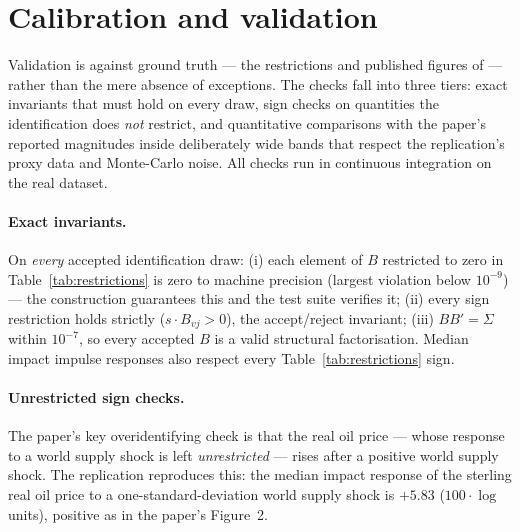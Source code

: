 \section{Calibration and validation}
\label{sec:validation}

Validation is against ground truth --- the restrictions and published figures of \citet{brignone2025} --- rather than the mere absence of exceptions. The checks fall into three tiers: exact invariants that must hold on every draw, sign checks on quantities the identification does \emph{not} restrict, and quantitative comparisons with the paper's reported magnitudes inside deliberately wide bands that respect the replication's proxy data and Monte-Carlo noise. All checks run in continuous integration on the real dataset.

\paragraph{Exact invariants.} On \emph{every} accepted identification draw: (i) each element of $B$ restricted to zero in Table~\ref{tab:restrictions} is zero to machine precision (largest violation below $10^{-9}$) --- the \citet{arias2018} construction guarantees this and the test suite verifies it; (ii) every sign restriction holds strictly ($s \cdot B_{vj} > 0$), the accept/reject invariant; (iii) $BB' = \Sigma$ within $10^{-7}$, so every accepted $B$ is a valid structural factorisation. Median impact impulse responses also respect every Table~\ref{tab:restrictions} sign.

\paragraph{Unrestricted sign checks.} The paper's key overidentifying check is that the real oil price --- whose response to a world supply shock is left \emph{unrestricted} --- rises after a positive world supply shock. The replication reproduces this: the median impact response of the sterling real oil price to a one-standard-deviation world supply shock is $+5.83$ ($100\cdot\log$ units), positive as in the paper's Figure~2.

